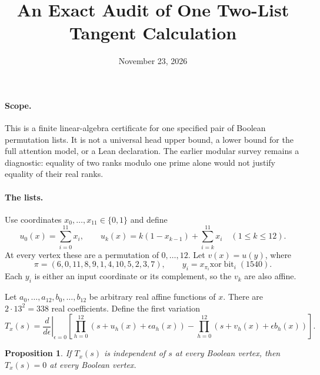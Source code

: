\documentclass[11pt]{article}
\newtheorem{proposition}{Proposition}
\begin{document}
\title{An Exact Audit of One Two-List Tangent Calculation}
\author{}
\date{November 23, 2026}
\maketitle

\paragraph{Scope.}
This is a finite linear-algebra certificate for one specified pair of
Boolean permutation lists. It is not a universal head upper bound,
a lower bound for the full attention model, or a Lean declaration.
The earlier modular survey remains a diagnostic: equality of two ranks
modulo one prime alone would not justify equality of their real ranks.

\paragraph{The lists.}
Use coordinates $x_0,\ldots,x_{11}\in\{0,1\}$ and define
\[
 u_0(x)=\sum_{i=0}^{11}x_i,\qquad
 u_k(x)=k(1-x_{k-1})+\sum_{i=k}^{11}x_i
                      \quad(1\le k\le12).
\]
At every vertex these are a permutation of $0,\ldots,12$.
Let $v(x)=u(y)$, where
\[
 \pi=(6,0,11,8,9,1,4,10,5,2,3,7),\qquad
 y_i=x_{\pi_i}\mathbin{\mathrm{xor}}\operatorname{bit}_i(1540).
\]
Each $y_i$ is either an input coordinate or its complement, so the
$v_k$ are also affine.

Let $a_0,\ldots,a_{12},b_0,\ldots,b_{12}$ be arbitrary real affine
functions of $x$. There are $2\cdot13^2=338$ real coefficients.
Define the first variation
\[
 T_x(s)=\left.\frac{d}{d\epsilon}\right|_{\epsilon=0}
 \left[\prod_{h=0}^{12}(s+u_h(x)+\epsilon a_h(x))
       -\prod_{h=0}^{12}(s+v_h(x)+\epsilon b_h(x))\right].
\]

\begin{proposition}
If $T_x(s)$ is independent of $s$ at every Boolean vertex, then
$T_x(s)=0$ at every Boolean vertex.
\end{proposition}
\end{document}
